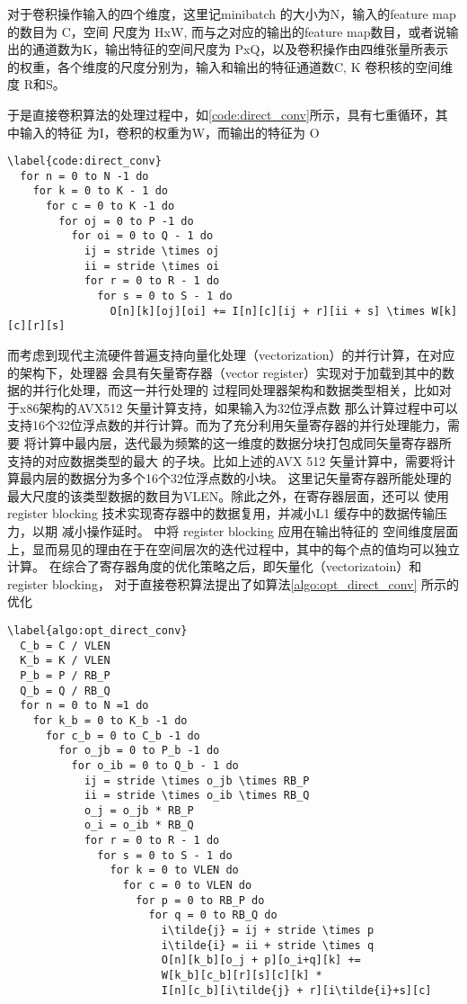 对于卷积操作输入的四个维度，这里记minibatch 的大小为N，输入的feature map的数目为 C，空间
尺度为 HxW, 而与之对应的输出的feature map数目，或者说输出的通道数为K，输出特征的空间尺度为
PxQ，以及卷积操作由四维张量所表示的权重，各个维度的尺度分别为，输入和输出的特征通道数C, K 
卷积核的空间维度 R和S。

于是直接卷积算法的处理过程中，如\ref{code:direct_conv}所示，具有七重循环，其中输入的特征
为I，卷积的权重为W，而输出的特征为 O 

\begin{lstlisting}
\label{code:direct_conv}
  for n = 0 to N -1 do
    for k = 0 to K - 1 do
      for c = 0 to K -1 do
        for oj = 0 to P -1 do
          for oi = 0 to Q - 1 do
            ij = stride \times oj
            ii = stride \times oi
            for r = 0 to R - 1 do
              for s = 0 to S - 1 do
                O[n][k][oj][oi] += I[n][c][ij + r][ii + s] \times W[k][c][r][s]
\end{lstlisting}

而考虑到现代主流硬件普遍支持向量化处理（vectorization）的并行计算，在对应的架构下，处理器
会具有矢量寄存器（vector register）实现对于加载到其中的数据的并行化处理，而这一并行处理的
过程同处理器架构和数据类型相关，比如对于x86架构的AVX512 矢量计算支持，如果输入为32位浮点数
那么计算过程中可以支持16个32位浮点数的并行计算。而为了充分利用矢量寄存器的并行处理能力，需要
将计算中最内层，迭代最为频繁的这一维度的数据分块打包成同矢量寄存器所支持的对应数据类型的最大
的子块。比如上述的AVX 512 矢量计算中，需要将计算最内层的数据分为多个16个32位浮点数的小块。
这里记矢量寄存器所能处理的最大尺度的该类型数据的数目为VLEN。除此之外，在寄存器层面，还可以
使用 register blocking 技术实现寄存器中的数据复用，并减小L1 缓存中的数据传输压力，以期
减小操作延时。\cite{Georganas2018AnatomyOH} 中将 register blocking 应用在输出特征的
空间维度层面上，显而易见的理由在于在空间层次的迭代过程中，其中的每个点的值均可以独立计算。
在综合了寄存器角度的优化策略之后，即矢量化（vectorizatoin）和 register blocking，
\cite{Georganas2018AnatomyOH} 对于直接卷积算法提出了如算法\ref{algo:opt_direct_conv}
所示的优化

\begin{lstlisting}
\label{algo:opt_direct_conv}
  C_b = C / VLEN
  K_b = K / VLEN
  P_b = P / RB_P
  Q_b = Q / RB_Q
  for n = 0 to N =1 do
    for k_b = 0 to K_b -1 do
      for c_b = 0 to C_b -1 do
        for o_jb = 0 to P_b -1 do
          for o_ib = 0 to Q_b - 1 do
            ij = stride \times o_jb \times RB_P
            ii = stride \times o_ib \times RB_Q
            o_j = o_jb * RB_P
            o_i = o_ib * RB_Q
            for r = 0 to R - 1 do
              for s = 0 to S - 1 do
                for k = 0 to VLEN do
                  for c = 0 to VLEN do
                    for p = 0 to RB_P do
                      for q = 0 to RB_Q do
                        i\tilde{j} = ij + stride \times p
                        i\tilde{i} = ii + stride \times q
                        O[n][k_b][o_j + p][o_i+q][k] += 
                        W[k_b][c_b][r][s][c][k] * 
                        I[n][c_b][i\tilde{j} + r][i\tilde{i}+s][c]
\end{lstlisting}

